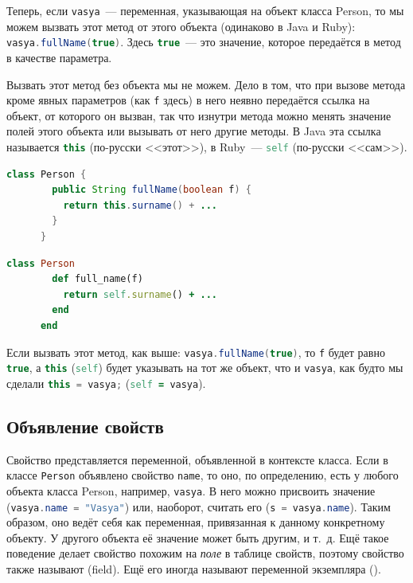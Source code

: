 \documentclass[a4paper, 14pt, titlepage]{extarticle}
\newcommand{\eng}[1]{{\English #1}}
\newcommand{\define}[1]{\uwave{#1}}
\newenvironment{halfpage}%
    {\noindent\begin{minipage}[h]{0.49\linewidth}} %
    {\end{minipage}\hfill}
\newcommand{\inlinecode}[2][Java]{\lstinline[basicstyle=\ttfamily, language=#1]{#2}}
\begin{document}
  Теперь, если \inlinecode{vasya}~--- переменная, указывающая на объект класса Person, то мы можем
  вызвать этот метод от этого объекта (одинаково в Java и Ruby): \inlinecode{vasya.fullName(true)}.
  Здесь \inlinecode{true}~--- это значение, которое передаётся в метод в качестве параметра.

  Вызвать этот метод без объекта мы не можем. Дело в том, что при вызове метода кроме явных
  параметров (как \inlinecode{f} здесь) в него неявно передаётся ссылка на объект, от которого он
  вызван, так что изнутри метода можно менять значение полей этого объекта или вызывать от него
  другие методы. В Java эта ссылка называется \inlinecode[Java]{this} (по-русски <<этот>>), в
  Ruby~--- \inlinecode[Ruby]{self} (по-русски <<сам>>).

  \begin{halfpage}
    \begin{lstlisting}[language=Java, title={Метод в Java}, gobble=6, texcl]
      class Person {
        public String fullName(boolean f) {
          return this.surname() + ...
        }
      }
    \end{lstlisting}
  \end{halfpage}
  \begin{halfpage}
    \begin{lstlisting}[language=Ruby, title={Метод в Ruby}, gobble=6, texcl]
      class Person
        def full_name(f)
          return self.surname() + ...
        end
      end
    \end{lstlisting}
  \end{halfpage}

  Если вызвать этот метод, как выше: \inlinecode{vasya.fullName(true)},
  то \inlinecode{f} будет равно \inlinecode{true}, а \inlinecode[Java]{this} (\inlinecode[Ruby]{self})
  будет указывать на тот же объект, что и \inlinecode{vasya}, как будто мы сделали
  \inlinecode[Java]{this = vasya;} (\inlinecode[Ruby]{self = vasya}).

  \subsection{Объявление свойств}

  Свойство представляется переменной, объявленной в контексте класса. Если в классе
  \inlinecode{Person} объявлено свойство \inlinecode{name}, то оно, по определению, есть у любого
  объекта класса Person, например, \inlinecode{vasya}. В него можно присвоить значение (\inlinecode{vasya.name = "Vasya"})
  или, наоборот, считать его (\inlinecode{s = vasya.name}). Таким образом, оно ведёт себя как переменная,
  привязанная к данному конкретному объекту. У другого объекта её значение может быть другим, и
  т.~д. Ещё такое поведение делает свойство похожим на \emph{поле} в таблице свойств, поэтому свойство
  также называют \define{полем} (field). Ещё его иногда называют переменной экземпляра
  (\define{\eng{instance variable}}).
\end{document}
